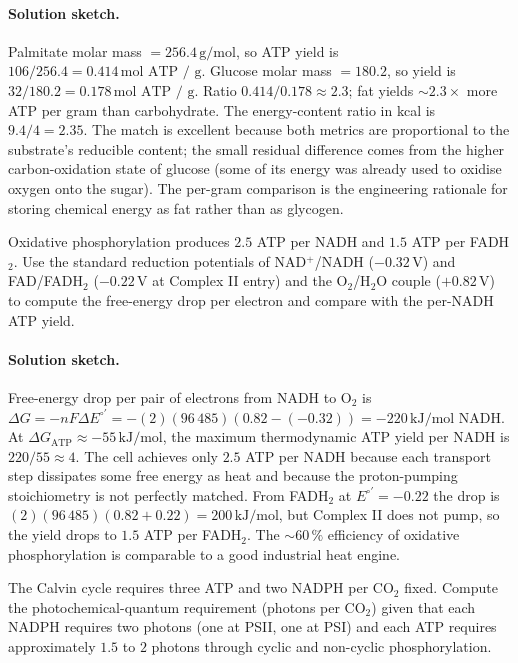 \paragraph{Solution sketch.}
Palmitate molar mass $= 256.4\,\text{g}/\text{mol}$, so ATP yield is
$106/256.4 = 0.414\,\text{mol ATP / g}$. Glucose molar mass $=
180.2$, so yield is $32/180.2 = 0.178\,\text{mol ATP / g}$. Ratio
$0.414/0.178 \approx 2.3$; fat yields $\sim 2.3 \times$ more ATP per
gram than carbohydrate. The energy-content ratio in kcal is
$9.4/4 = 2.35$. The match is excellent because both metrics are
proportional to the substrate's reducible content; the small residual
difference comes from the higher carbon-oxidation state of glucose
(some of its energy was already used to oxidise oxygen onto the
sugar). The per-gram comparison is the engineering rationale for
storing chemical energy as fat rather than as glycogen.

\begin{exercise}
Oxidative phosphorylation produces $2.5$ ATP per NADH and $1.5$ ATP
per FADH$_2$. Use the standard reduction potentials of NAD$^+$/NADH
($-0.32\,\text{V}$) and FAD/FADH$_2$ ($-0.22\,\text{V}$ at Complex II
entry) and the O$_2$/H$_2$O couple ($+0.82\,\text{V}$) to compute
the free-energy drop per electron and compare with the per-NADH ATP
yield.
\end{exercise}

\paragraph{Solution sketch.}
Free-energy drop per pair of electrons from NADH to O$_2$ is
$\Delta G = -nF\Delta E^{\circ\prime} = -(2)(96\,485)(0.82 - (-0.32))
= -220\,\text{kJ}/\text{mol NADH}$. At $\Delta G_{\text{ATP}}
\approx -55\,\text{kJ}/\text{mol}$, the maximum thermodynamic ATP
yield per NADH is $220/55 \approx 4$. The cell achieves only $2.5$
ATP per NADH because each transport step dissipates some free energy
as heat and because the proton-pumping stoichiometry is not perfectly
matched. From FADH$_2$ at $E^{\circ\prime} = -0.22$ the drop is
$(2)(96\,485)(0.82 + 0.22) = 200\,\text{kJ}/\text{mol}$, but Complex
II does not pump, so the yield drops to $1.5$ ATP per FADH$_2$. The
$\sim 60\,\%$ efficiency of oxidative phosphorylation is comparable
to a good industrial heat engine.

\begin{exercise}
The Calvin cycle requires three ATP and two NADPH per CO$_2$ fixed.
Compute the photochemical-quantum requirement (photons per CO$_2$)
given that each NADPH requires two photons (one at PSII, one at PSI)
and each ATP requires approximately $1.5$ to $2$ photons through
cyclic and non-cyclic phosphorylation.
\end{exercise}

